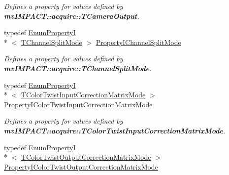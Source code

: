 \begin{DoxyCompactItemize}
\begin{DoxyCompactList}\small\item\em Defines a property for values defined by {\bfseries mv\+I\+M\+P\+A\+C\+T\+::acquire\+::\+T\+Camera\+Output}. \end{DoxyCompactList}\item 
\hypertarget{group___common_interface_ga10dc070afa8c2d87bc6316c6a8507e82}{typedef \hyperlink{classmv_i_m_p_a_c_t_1_1acquire_1_1_enum_property_i}{Enum\+Property\+I}\\*
$<$ \hyperlink{group___common_interface_gae8e9f7bb0e510d844b2681642e8e46d2}{T\+Channel\+Split\+Mode} $>$ \hyperlink{group___common_interface_ga10dc070afa8c2d87bc6316c6a8507e82}{Property\+I\+Channel\+Split\+Mode}}\label{group___common_interface_ga10dc070afa8c2d87bc6316c6a8507e82}

\begin{DoxyCompactList}\small\item\em Defines a property for values defined by {\bfseries mv\+I\+M\+P\+A\+C\+T\+::acquire\+::\+T\+Channel\+Split\+Mode}. \end{DoxyCompactList}\item 
\hypertarget{group___common_interface_gad8aa01209e3623c8739f5e1ded1b187d}{typedef \hyperlink{classmv_i_m_p_a_c_t_1_1acquire_1_1_enum_property_i}{Enum\+Property\+I}\\*
$<$ \hyperlink{group___common_interface_ga514bdc683ef27995fdeba04aec25f571}{T\+Color\+Twist\+Input\+Correction\+Matrix\+Mode} $>$ \hyperlink{group___common_interface_gad8aa01209e3623c8739f5e1ded1b187d}{Property\+I\+Color\+Twist\+Input\+Correction\+Matrix\+Mode}}\label{group___common_interface_gad8aa01209e3623c8739f5e1ded1b187d}

\begin{DoxyCompactList}\small\item\em Defines a property for values defined by {\bfseries mv\+I\+M\+P\+A\+C\+T\+::acquire\+::\+T\+Color\+Twist\+Input\+Correction\+Matrix\+Mode}. \end{DoxyCompactList}\item 
\hypertarget{group___common_interface_gacf5323a7be006494492dd5f8c11c730e}{typedef \hyperlink{classmv_i_m_p_a_c_t_1_1acquire_1_1_enum_property_i}{Enum\+Property\+I}\\*
$<$ \hyperlink{group___common_interface_ga0892ed0e7e5949707e49bb7d584f8478}{T\+Color\+Twist\+Output\+Correction\+Matrix\+Mode} $>$ \hyperlink{group___common_interface_gacf5323a7be006494492dd5f8c11c730e}{Property\+I\+Color\+Twist\+Output\+Correction\+Matrix\+Mode}}\label{group___common_interface_gacf5323a7be006494492dd5f8c11c730e}


\end{DoxyCompactItemize}
